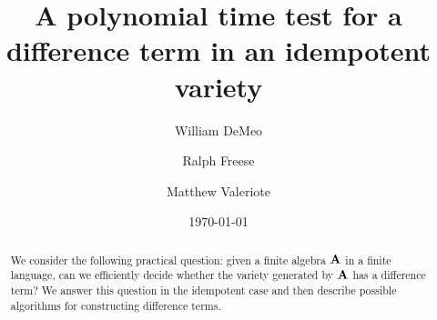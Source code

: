 
\usepackage{color}
\usepackage{amsmath}
\usepackage{amsfonts}
\usepackage{amscd}
\usepackage{inputs/rflatexmacs}
\usepackage{inputs/wjdlatexmacs}

\usepackage[mathcal]{euscript}
\usepackage{comment}

\renewcommand{\th}[2]{#1\mathrel{\theta}#2}
\newcommand{\infixrel}[3]{#2\mathrel{#1}#3}



\newtheorem{theorem}{Theorem}
\newtheorem{lemma}[theorem]{Lemma}
\newtheorem{corollary}[theorem]{Corollary}
\newtheorem{prop}[theorem]{Proposition}
\newtheorem{example}[theorem]{Example}
\newtheorem{conjecture}[theorem]{Conjecture}
\newtheorem{fact}[theorem]{Fact}
\newtheorem{prob}{Problem}

\title[A test for a difference term]{A polynomial time test for a
difference term in an idempotent variety}
\author[DeMeo]{William DeMeo}
\address[William DeMeo]{
Department of Mathematics\\
University of Hawaii\\
Honolulu, Hawaii\\
96822 USA}
\author[Freese]{Ralph Freese}
\address[Ralph Freese]{
Department of Mathematics\\
University of Hawaii\\
Honolulu, Hawaii\\
96822 USA}
\author[Valeriote]{Matthew Valeriote}
\address[Matthew Valeriote]{
Department of Mathematics\\
McMaster University\\
Hamilton, Ontario\\
xxxxx Canada}

\date{\today}



\maketitle 

\begin{abstract}
We consider the following practical question: given a finite 
algebra $\mathbf{A}$ in a
finite language, can we efficiently decide whether the variety 
generated by $\mathbf{A}$
has a difference term?  We answer this question in the idempotent case
and then describe possible algorithms for constructing difference terms.
\end{abstract}


